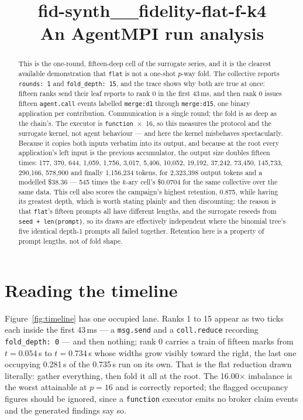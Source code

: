 \documentclass[11pt]{article}
\title{\textbf{fid-synth\_\_fidelity-flat-f-k4}\\[2pt]\large An AgentMPI run analysis}
\author{}
\date{}
\begin{document}
\maketitle

\begin{abstract}
This is the one-round, fifteen-deep cell of the surrogate series, and it is the clearest
available demonstration that \texttt{flat} is not a one-shot $p$-way fold. The collective
reports \texttt{rounds: 1} and \texttt{fold\_depth: 15}, and the trace shows why both are
true at once: fifteen ranks send their leaf reports to rank 0 in the first 43\,ms, and then
rank 0 issues fifteen \texttt{agent.call} events labelled \texttt{merge:d1} through
\texttt{merge:d15}, one binary application per contribution. Communication is a single
round; the fold is as deep as the chain's. The executor is \texttt{function}~$\times$~16, so
this measures the protocol and the surrogate kernel, not agent behaviour --- and here the
kernel misbehaves spectacularly. Because it copies both inputs verbatim into its output, and
because at the root every application's left input is the previous accumulator, the output
size doubles fifteen times: 177, 370, 644, 1{,}059, 1{,}756, 3{,}017, 5{,}406, 10{,}052,
19{,}192, 37{,}242, 73{,}450, 145{,}733, 290{,}166, 578{,}900 and finally 1{,}156{,}234
tokens, for 2{,}323{,}398 output tokens and a modelled \$38.36 --- 545 times the $k$-ary
cell's \$0.0704 for the same collective over the same data. This cell also scores the
campaign's highest retention, 0.875, while having its greatest depth, which is worth stating
plainly and then discounting: the reason is that \texttt{flat}'s fifteen prompts all have
different lengths, and the surrogate reseeds from \texttt{seed + len(prompt)}, so its
draws are effectively independent where the binomial tree's five identical depth-1 prompts
all failed together. Retention here is a property of prompt lengths, not of fold shape.
\end{abstract}



\section{Reading the timeline}

Figure~\ref{fig:timeline} has one occupied lane. Ranks 1 to 15 appear as two ticks each
inside the first 43\,ms --- a \texttt{msg.send} and a \texttt{coll.reduce} recording
\texttt{fold\_depth: 0} --- and then nothing; rank 0 carries a train of fifteen marks from
$t=0.054$\,s to $t=0.734$\,s whose widths grow visibly toward the right, the last one
occupying 0.281\,s of the 0.735\,s run on its own. That is the flat reduction drawn
literally: gather everything, then fold it all at the root. The 16.00$\times$ imbalance is
the worst attainable at $p=16$ and is correctly reported; the flagged occupancy figures
should be ignored, since a \texttt{function} executor emits no broker claim events and the
generated findings say so.
\end{document}
